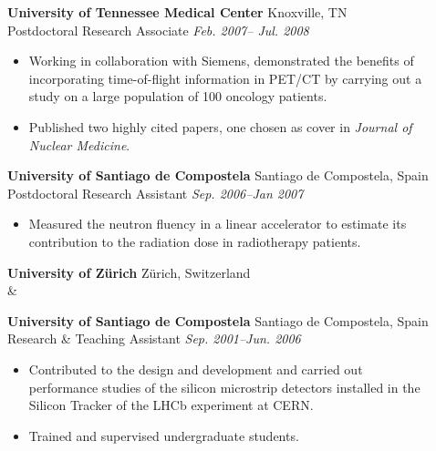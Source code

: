 \documentclass[letterpaper]{article}
\begin{document}
\begin{description}
\item[] \textbf{University of Tennessee Medical Center} \hfill Knoxville, TN \\
Postdoctoral Research Associate \hfill \textit{Feb. 2007-- Jul. 2008} 
 \vspace*{-0.2cm}
 \begin{itemize} 
 \item Working in collaboration with Siemens, demonstrated the benefits of incorporating time-of-flight information in PET/CT by carrying out a study on a large population of 100 oncology patients. 
\item Published two highly cited papers, one chosen as cover in \textit{Journal of Nuclear Medicine}.
 \end{itemize} 
 
\item[] \textbf{University of Santiago de Compostela} \hfill Santiago de Compostela, Spain\\
    Postdoctoral Research Assistant \hfill \textit{Sep. 2006--Jan 2007}
\vspace*{-0.2cm}
\begin{itemize}
  \item  Measured the neutron fluency in a linear accelerator to estimate its
    contribution to the radiation dose in radiotherapy patients.
 \end{itemize} 

\item[] \textbf{University of Z\"urich} \hfill Z\"urich, Switzerland \\
 \&
\item[] \vspace*{-2.5ex} \textbf{University of Santiago de Compostela} \hfill Santiago de Compostela, Spain\\
    Research \& Teaching Assistant \hfill \textit{Sep. 2001--Jun. 2006}
\vspace*{-0.2cm}
\begin{itemize}
\item   Contributed to the design and development and carried out performance studies of the silicon microstrip detectors installed in the Silicon Tracker of the LHCb experiment at CERN.
\item Trained and supervised undergraduate students. 
\end{itemize} 
\end{description}
\end{document}
